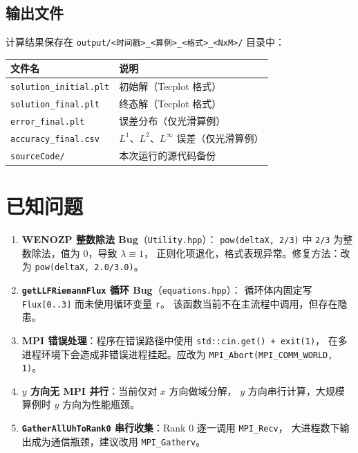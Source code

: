 \documentclass{article}
\numberwithin{equation}{section}
\begin{document}
\subsection{输出文件}

计算结果保存在 \texttt{output/<时间戳>\_<算例>\_<格式>\_<NxM>/} 目录中：

\begin{table}[H]
\centering
\begin{tabular}{ll}
\toprule
文件名 & 说明 \\
\midrule
\texttt{solution\_initial.plt} & 初始解（Tecplot 格式） \\
\texttt{solution\_final.plt}   & 终态解（Tecplot 格式） \\
\texttt{error\_final.plt}      & 误差分布（仅光滑算例）\\
\texttt{accuracy\_final.csv}   & $L^1$、$L^2$、$L^\infty$ 误差（仅光滑算例）\\
\texttt{sourceCode/}           & 本次运行的源代码备份 \\
\bottomrule
\end{tabular}
\end{table}

\section{已知问题}

\begin{enumerate}
    \item \textbf{WENOZP 整数除法 Bug}（\texttt{Utility.hpp}）：
          \texttt{pow(deltaX, 2/3)} 中 \texttt{2/3} 为整数除法，值为 0，导致 $\lambda \equiv 1$，
          正则化项退化，格式表现异常。修复方法：改为 \texttt{pow(deltaX, 2.0/3.0)}。

    \item \textbf{\texttt{getLLFRiemannFlux} 循环 Bug}（\texttt{equations.hpp}）：
          循环体内固定写 \texttt{Flux[0..3]} 而未使用循环变量 \texttt{r}。
          该函数当前不在主流程中调用，但存在隐患。

    \item \textbf{MPI 错误处理}：程序在错误路径中使用 \texttt{std::cin.get() + exit(1)}，
          在多进程环境下会造成非错误进程挂起。应改为 \texttt{MPI\_Abort(MPI\_COMM\_WORLD, 1)}。

    \item \textbf{$y$ 方向无 MPI 并行}：当前仅对 $x$ 方向做域分解，
          $y$ 方向串行计算，大规模算例时 $y$ 方向为性能瓶颈。

    \item \textbf{\texttt{GatherAllUhToRank0} 串行收集}：Rank 0 逐一调用 \texttt{MPI\_Recv}，
          大进程数下输出成为通信瓶颈，建议改用 \texttt{MPI\_Gatherv}。
\end{enumerate}
\end{document}
